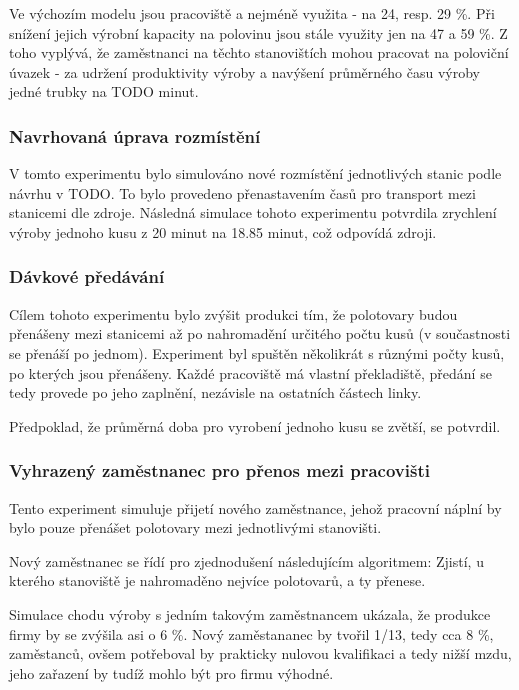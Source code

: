 \documentclass[11pt, a4paper]{article}
\begin{document}
Ve výchozím modelu jsou pracoviště  a  nejméně využita - na 24, resp. 29 \%. Při snížení jejich výrobní kapacity na polovinu jsou stále využity jen na 47 a 59 \%. Z toho vyplývá, že zaměstnanci na těchto stanovištích mohou pracovat na poloviční úvazek - za udržení produktivity výroby a navýšení průměrného času výroby jedné trubky na TODO minut.


\subsubsection{Navrhovaná úprava rozmístění}
V tomto experimentu bylo simulováno nové rozmístění jednotlivých stanic podle návrhu v TODO. To bylo provedeno přenastavením časů pro transport mezi stanicemi dle zdroje. Následná simulace tohoto experimentu potvrdila zrychlení výroby jednoho kusu z 20 minut na 18.85 minut, což odpovídá zdroji.


\subsubsection{Dávkové předávání}
Cílem tohoto experimentu bylo zvýšit produkci tím, že polotovary budou přenášeny mezi stanicemi až po nahromadění určitého počtu kusů (v součastnosti se přenáší po jednom). Experiment byl spuštěn několikrát s různými počty kusů, po kterých jsou přenášeny. Každé pracoviště má vlastní překladiště, předání se tedy provede po jeho zaplnění, nezávisle na ostatních částech linky.

Předpoklad, že průměrná doba pro vyrobení jednoho kusu se zvětší, se potvrdil.


\subsubsection{Vyhrazený zaměstnanec pro přenos mezi pracovišti}
Tento experiment simuluje přijetí nového zaměstnance, jehož pracovní náplní by bylo pouze přenášet polotovary mezi jednotlivými stanovišti.

Nový zaměstnanec se řídí pro zjednodušení následujícím algoritmem: Zjistí, u kterého stanoviště je nahromaděno nejvíce polotovarů, a ty přenese.

Simulace chodu výroby s jedním takovým zaměstnancem ukázala, že produkce firmy by se zvýšila asi o 6 \%. Nový zaměstananec by tvořil 1/13, tedy cca 8 \%, zaměstanců, ovšem potřeboval by prakticky nulovou kvalifikaci a tedy nižší mzdu, jeho zařazení by tudíž mohlo být pro firmu výhodné.
\end{document}
